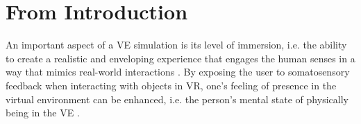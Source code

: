 
\begin{comment}
REWRITTEN FOR BETTER READABILITY:
Simulations in virtual reality (VR) provide a comprehensive platform for users to acquire new skills and competencies, as well as for the evaluation of their performance while being in a controlled and safe environment \cite{Harris2021ExploringSimulator}. In the virtual environment (VE), complex skills can be studied without giving up on experimental control, which facilitates the understanding of motor learning on a level that is not possible in the physical world \cite{Levac2019LearningReview}. 
Possible applications involve physical therapy and rehabilitation, sports training, education, marketing, telerobotics, and research, as well as gaming and entertainment \cite{Wu2023TrainingReality, Oagaz2022PerformanceReality}. Therefore it is not surprising that there is a great interest in VR-based training simulations, especially to teach skills that would otherwise have to be acquired in dangerous or sensitive environments, such as construction work, military training, or surgical operations \cite{Adami2021EffectivenessTeleoperation, Lele2013VirtualUtility, Qi2021VirtualScenario}.
\end{comment}

\section{From Introduction}
An important aspect of a VE simulation is its level of immersion, i.e. the ability to create a realistic and enveloping experience that engages the human senses in a way that mimics real-world interactions \cite{Sanchez-Vives2005FromReality, Slater2016EnhancingReality}. By exposing the user to somatosensory feedback when interacting with objects in VR, one's feeling of presence in the virtual environment can be enhanced, i.e. the person's mental state of physically being in the VE \cite{Draper1998Telepresence, Dzardanova2024ExploringReality}. 

